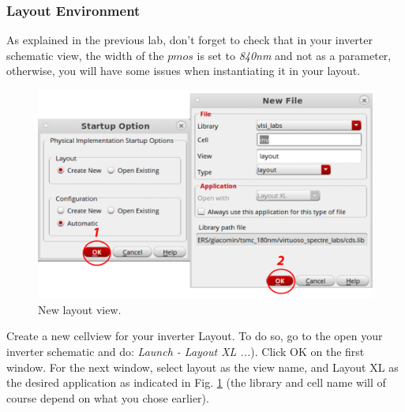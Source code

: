 \subsubsection{Layout Environment}
		\begin{remark}
	As explained in the previous lab, don't forget to check that in your inverter schematic view, the width of the $pmos$ is set to \textit{840nm} and not as a parameter, otherwise, you will have some issues when instantiating it in your layout.
\end{remark}
			\vspace{-8mm}
\begin{enumerate}
	
	\parbox[t]{\dimexpr\textwidth-\leftmargin}{%
		\begin{figure}
			\vspace{-0mm}
			\centering
			\vspace{-\baselineskip}
			\includegraphics[scale=0.35]{figures/lab2_layout/layout_create.pdf}
			\caption{New layout view.}
			\label{fig_layoutfile}
		\end{figure}
		\item Create a new cellview for your inverter Layout. To do so, go to the open your inverter schematic and do: \textit{Launch - Layout XL ...}). Click OK on the first window. For the next window, select layout as the view name, and Layout XL as the desired application as indicated in Fig. \ref{fig_layoutfile} (the library and cell name will of course depend on what you chose earlier). \newline}
	

\end{enumerate}

